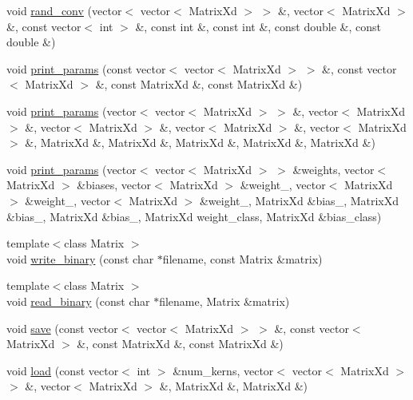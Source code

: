 \begin{DoxyCompactItemize}
void \hyperlink{namespacelibcnn_a449702bcc49494b8e359548d03ba12e3}{rand\-\_\-conv} (vector$<$ vector$<$ \-Matrix\-Xd $>$ $>$ \&, vector$<$ \-Matrix\-Xd $>$ \&, const vector$<$ int $>$ \&, const int \&, const int \&, const double \&, const double \&)
\item 
void \hyperlink{namespacelibcnn_a6e166be43bf4a7640feef235071df26e}{print\-\_\-params} (const vector$<$ vector$<$ \-Matrix\-Xd $>$ $>$ \&, const vector$<$ \-Matrix\-Xd $>$ \&, const \-Matrix\-Xd \&, const \-Matrix\-Xd \&)
\item 
void \hyperlink{namespacelibcnn_a35fa40f645f5fe20b4cc8d878b1e0c10}{print\-\_\-params} (vector$<$ vector$<$ \-Matrix\-Xd $>$ $>$ \&, vector$<$ \-Matrix\-Xd $>$ \&, vector$<$ \-Matrix\-Xd $>$ \&, vector$<$ \-Matrix\-Xd $>$ \&, vector$<$ \-Matrix\-Xd $>$ \&, \-Matrix\-Xd \&, \-Matrix\-Xd \&, \-Matrix\-Xd \&, \-Matrix\-Xd \&, \-Matrix\-Xd \&)
\item 
void \hyperlink{namespacelibcnn_affc4a94fd6208861218bf25631d2ab39}{print\-\_\-params} (vector$<$ vector$<$ \-Matrix\-Xd $>$ $>$ \&weights, vector$<$ \-Matrix\-Xd $>$ \&biases, vector$<$ \-Matrix\-Xd $>$ \&weight\-\_, vector$<$ \-Matrix\-Xd $>$ \&weight\-\_, vector$<$ \-Matrix\-Xd $>$ \&weight\-\_, \-Matrix\-Xd \&bias\-\_, \-Matrix\-Xd \&bias\-\_, \-Matrix\-Xd \&bias\-\_, \-Matrix\-Xd weight\-\_\-class, \-Matrix\-Xd \&bias\-\_\-class)
\item 
{\footnotesize template$<$class Matrix $>$ }\\void \hyperlink{namespacelibcnn_ab9d1cc7fff65924fba4673d248ce5b84}{write\-\_\-binary} (const char $\ast$filename, const \-Matrix \&matrix)
\item 
{\footnotesize template$<$class Matrix $>$ }\\void \hyperlink{namespacelibcnn_a08fddcf34488abeb9551fa4ba5f69b02}{read\-\_\-binary} (const char $\ast$filename, \-Matrix \&matrix)
\item 
void \hyperlink{namespacelibcnn_aa0d2c742374c714e8acadc2f2768db9e}{save} (const vector$<$ vector$<$ \-Matrix\-Xd $>$ $>$ \&, const vector$<$ \-Matrix\-Xd $>$ \&, const \-Matrix\-Xd \&, const \-Matrix\-Xd \&)
\item 
void \hyperlink{namespacelibcnn_a05600c0680e871c0893560d97dce3179}{load} (const vector$<$ int $>$ \&num\-\_\-kerns, vector$<$ vector$<$ \-Matrix\-Xd $>$ $>$ \&, vector$<$ \-Matrix\-Xd $>$ \&, \-Matrix\-Xd \&, \-Matrix\-Xd \&)
\end{DoxyCompactItemize}


